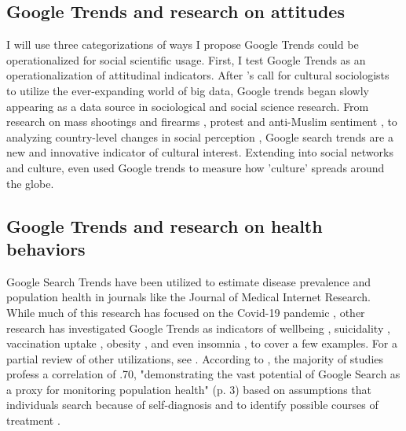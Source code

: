 \subsection{Google Trends and research on attitudes}

I will use three categorizations of ways I propose Google Trends could
be operationalized for social scientific usage. First, I test Google
Trends as an operationalization of attitudinal indicators. 
After \citet{bailCulturalEnvironmentMeasuring2014}'s call for
cultural sociologists to utilize the ever-expanding world of big data,
Google trends began slowly appearing as a data source in sociological and
social science research. From research on mass shootings and firearms \citep{brownsteinInternetSearchPatterns2020, semenzaInformationseekingWakeTragedy2020}, 
protest and anti-Muslim sentiment \citep{bailUsingInternetSearch2018,barrieSearchingRacismGeorge2020,grossThereFergusonEffect2017},
to analyzing country-level changes in social perception \citep{reyes_etal18},
Google search trends are a new and innovative indicator of cultural interest.
Extending into social networks and culture, \citet{bailPrestigeProximityPrejudice2019}
even used Google trends to measure how 'culture' spreads around the globe.

\subsection{Google Trends and research on health behaviors}

Google Search Trends have been utilized to estimate disease prevalence
and population health in journals like the Journal of
Medical Internet Research. While much of this research has focused on
the Covid-19 pandemic \citep{jimenez_etal20, jimenezCOVID19SymptomGoogle2020, limEstimatingInformationSeekingBehaviour2020, mavraganiCOVID19PredictabilityUnited2020, nguyenGoogleTrendsAnalysis2020, todorovaInternetBasedData2021, mingUnderstandingHealthCommunication2021},
other research has investigated Google Trends as indicators of wellbeing
\citep{brodeurCOVID19LockdownsWellbeing2021, carpiTwitterSubjectiveWellBeing2020, duCOVID19IncreasesOnline2020},
suicidality \citep{burnettTimeTrendsPublic2020}, 
vaccination uptake \citep{dalumhansenEnsembleLearnedVaccination2016}, 
obesity \citep{sarigulNowcastingObesityUsing2014}, 
and even insomnia \citep{zittingGoogleTrendsReveal2020},
to cover a few examples. For a partial review of other utilizations, see \citet{nutiUseGoogleTrends2014}. According to \citet{jaidkaInformationseekingVsSharing2021}, the majority of studies profess
a correlation of \> .70, "demonstrating the vast potential of Google
Search as a proxy for monitoring population health" (p. 3) based on
assumptions that individuals search because of self-diagnosis and to
identify possible courses of treatment \citep{dechoudhurySeekingSharingHealth2014}.


